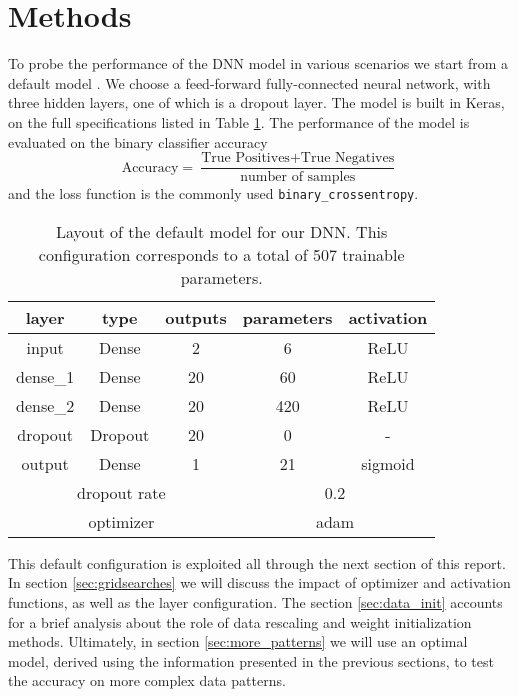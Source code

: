 \section*{Methods}
\label{sec:methods}

To probe the performance of the DNN model in various scenarios we start from a default model \cite{web:ref_notebooks}. We choose a feed-forward fully-connected neural network, with three hidden layers, one of which is a dropout layer. The model is built in Keras, on the full specifications listed in Table \ref{tab:default_model}. The performance of the model is evaluated on the binary classifier accuracy
\[ \text{Accuracy} = \frac{ \text{True Positives} + \text{True Negatives}}{\text{number of samples}}\]
and the loss function is the commonly used \texttt{binary\_crossentropy}.

\begin{table}[t]
\begin{tabular}{ccccc}
\hline\hline layer    & type    & outputs & parameters & activation\\ \hline
input    & Dense   & 2       & 6     & ReLU     \\
dense\_1 & Dense   & 20      & 60    & ReLU     \\
dense\_2 & Dense   & 20      & 420   & ReLU     \\
dropout  & Dropout & 20      & 0     & -        \\
output   & Dense   & 1       & 21    & sigmoid  \\ \hline\hline
\multicolumn{3}{c}{dropout rate}  & \multicolumn{2}{c}{0.2} \\
\multicolumn{3}{c}{optimizer}  & \multicolumn{2}{c}{adam} \\ \hline\hline
\end{tabular}
\caption{\label{tab:default_model}Layout of the default model for our DNN. This configuration corresponds to a total of 507 trainable parameters.} %
\end{table}

This default configuration is exploited all through the next section of this report. In section \ref{sec:gridsearches} we will discuss the impact of optimizer and activation functions, as well as the layer configuration. The section \ref{sec:data_init} accounts for a brief analysis about the role of data rescaling and weight initialization methods. Ultimately, in section \ref{sec:more_patterns} we will use an optimal model, derived using the information presented in the previous sections, to test the accuracy on more complex data patterns.



